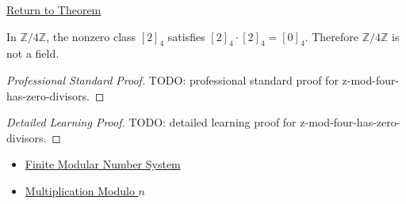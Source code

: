 \newpage
{}
\label{prf:z-mod-four-has-zero-divisors}

\begin{remark*}[Return]
\hyperref[thm:z-mod-four-has-zero-divisors]{Return to Theorem}
\end{remark*}

\begin{theorem*}
In \(\mathbb{Z}/4\mathbb{Z}\), the nonzero class \([2]_4\) satisfies
\([2]_4\cdot[2]_4=[0]_4\). Therefore \(\mathbb{Z}/4\mathbb{Z}\) is not a
field.
\end{theorem*}

\begin{proof}[Professional Standard Proof]
\LRAProofBodyStart
TODO: professional standard proof for z-mod-four-has-zero-divisors.
\end{proof}

\begin{proof}[Detailed Learning Proof]
\LRAProofBodyStart
TODO: detailed learning proof for z-mod-four-has-zero-divisors.
\end{proof}

\begin{remark*}
\end{remark*}

\begin{dependencies}
\begin{itemize}
  \item \hyperref[def:finite-modular-number-system]{Finite Modular Number System}
  \item \hyperref[def:multiplication-modulo-n]{Multiplication Modulo \(n\)}
\end{itemize}
\end{dependencies}

\clearpage
